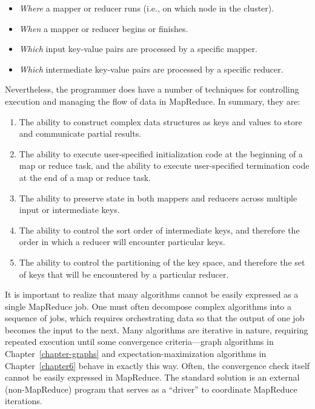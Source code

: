 \documentclass[11pt]{article}
\begin{document}
\begin{itemize}

\item \emph{Where} a mapper or reducer runs (i.e., on which node in the
  cluster).

\item \emph{When} a mapper or reducer begins or finishes.

\item \emph{Which} input key-value pairs are processed by a specific
  mapper.

\item \emph{Which} intermediate key-value pairs are processed by a
  specific reducer.

\end{itemize}

\noindent Nevertheless, the programmer does have a number of
techniques for controlling execution and managing the flow of data in
MapReduce.  In summary, they are:

\begin{enumerate}

\item The ability to construct complex data structures as keys and
  values to store and communicate partial results.

\item The ability to execute user-specified initialization code at the
  beginning of a map or reduce task, and the ability to execute
  user-specified termination code at the end of a map or reduce task.

\item The ability to preserve state in both mappers and reducers
  across multiple input or intermediate keys.

\item The ability to control the sort order of intermediate keys, and
  therefore the order in which a reducer will encounter particular
  keys.

\item The ability to control the partitioning of the key space, and
  therefore the set of keys that will be encountered by a particular
  reducer.

\end{enumerate}

\noindent It is important to realize that many algorithms cannot be
easily expressed as a single MapReduce job.  One must often decompose
complex algorithms into a sequence of jobs, which requires
orchestrating data so that the output of one job becomes the input to
the next.  Many algorithms are iterative in nature, requiring repeated
execution until some convergence criteria---graph algorithms in
Chapter~\ref{chapter-graphs} and expectation-maximization algorithms
in Chapter~\ref{chapter6} behave in exactly this way.  Often, the
convergence check itself cannot be easily expressed in MapReduce.  The
standard solution is an external (non-MapReduce) program that serves
as a ``driver'' to coordinate MapReduce iterations.
\end{document}
